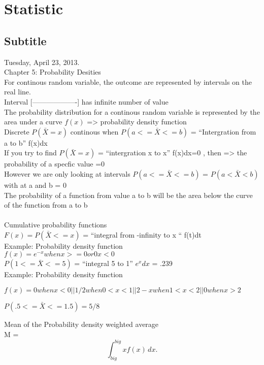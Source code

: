 \documentclass{article}
\begin{document}
\section{Statistic}

\subsection{Subtitle}
Tuesday, April 23, 2013.\\

Chapter 5: Probability Desities\\
	For continous random variable, the outcome are represented by
	intervals on the real line.\\
	Interval [-------------------] has infinite number of value\\
	The probability distribution for a continous random variable is 
	represented by the area under a curve $f(x)$ => probability density 
	function\\
	Discrete $ P(\bar{X} = x)$ continous when $P(a<=\bar{X}<=b)$ =
	``Intergration from a to b'' f(x)dx\\
	If you try to find $ P(\bar{X} = x)$  = ``intergration x to x'' f(x)dx=0
	, then => the probability of a specfic value =0\\
	However we are only looking at intervals
	$P(a<=\bar{X}<=b)$  = $P(a<\bar{X}<b)$  with at a and b = 0\\
	
	The probability of a function from value a to b will be the area below 
	the curve of the function from a to b\\
	\\
	Cumulative probability functions\\
	$F(x) = P(\bar{X} <= x)$ = ``integral from -infinity to x `` f(t)dt\\
	
	Example: Probability density function\\
	$ f(x) = e^{-x} when x>=0  or 0  x<0$\\
	
	$P(1<=\bar{X}<=5)$ = ``integral 5 to 1'' $e^{x}dx$ = .239\\
	
	Example: Probability density function
	
	$f(x) = 0  when x <0|| 1/2 when 0<x<1 || 2-x when 1<x<2|| 0 when x> 2$
	
	$P(.5<=\bar{X}<=1.5) = 5/8$
	
	Mean of the Probability density
	weighted average\\
	M = \[ \int_{big}^{big}xf(x)\,dx.\] 
	
\end{document}

